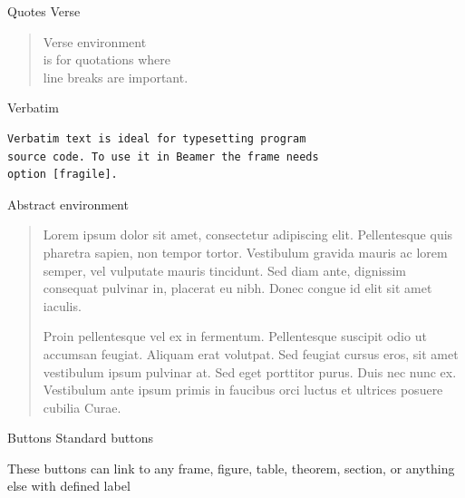 \documentclass[11pt,t,aspectratio=1610,nofootline]{beamer}
\begin{document}
\begin{frame}[fragile]{Quotes}
Verse
\begin{verse}
	Verse environment \\ 
	is for quotations where \\
	line breaks are important. 
\end{verse}

\vspace{11pt}
Verbatim
\begin{verbatim}
Verbatim text is ideal for typesetting program
source code. To use it in Beamer the frame needs
option [fragile].
\end{verbatim}
\end{frame}




\begin{frame}
\vspace{15pt}
Abstract environment
\begin{abstract}
	Lorem ipsum dolor sit amet, consectetur adipiscing elit. Pellentesque quis pharetra sapien, non tempor tortor. Vestibulum gravida mauris ac lorem semper, vel vulputate mauris tincidunt. Sed diam ante, dignissim consequat pulvinar in, placerat eu nibh. Donec congue id elit sit amet iaculis.
	
	Proin pellentesque vel ex in fermentum. Pellentesque suscipit odio ut accumsan feugiat. Aliquam erat volutpat. Sed feugiat cursus eros, sit amet vestibulum ipsum pulvinar at. Sed eget porttitor purus. Duis nec nunc ex. Vestibulum ante ipsum primis in faucibus orci luctus et ultrices posuere cubilia Curae.
\end{abstract}
\end{frame}




\begin{frame}[label=buttons]{Buttons}
Standard buttons

	\hyperlink{fig:figure1}{}

	\hyperlink{extraframe}{}


	\beamerreturnbutton{}

\vspace{11pt}
These buttons can link to any frame, figure, table, theorem, section, or anything else with defined label
\end{frame}
\end{document}
